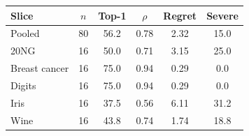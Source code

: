 \begin{tabular}{lccccc}
\toprule
Slice & $n$ & Top-1 & $\rho$ & Regret & Severe \\
\midrule
Pooled & 80 & 56.2 & 0.78 & 2.32 & 15.0 \\
20NG & 16 & 50.0 & 0.71 & 3.15 & 25.0 \\
Breast cancer & 16 & 75.0 & 0.94 & 0.29 & 0.0 \\
Digits & 16 & 75.0 & 0.94 & 0.29 & 0.0 \\
Iris & 16 & 37.5 & 0.56 & 6.11 & 31.2 \\
Wine & 16 & 43.8 & 0.74 & 1.74 & 18.8 \\
\bottomrule
\end{tabular}
